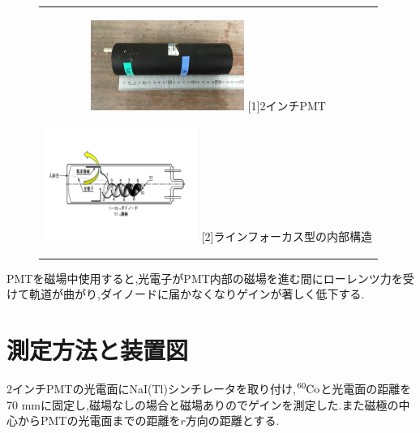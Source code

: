 \begin{figure}[htbp]
  \begin{center}
    \begin{tabular}{c}
      \begin{minipage}{0.5\hsize}    
        \begin{center}
          \includegraphics[clip,width=5cm]{fig/iguchi/PMTphoto.jpg}
	\hspace{1.6cm}[1]2インチPMT
     \end{center}
    \end{minipage}
      \begin{minipage}{0.5\hsize}    
        \begin{center}
          \includegraphics[clip,width=5cm]{fig/iguchi/PMTinner.pdf}
         \hspace{1.6cm}[2]ラインフォーカス型の内部構造
         \end{center}
        \end{minipage}
     
     \end{tabular}
     \label{PMT12}
    \end{center}
   \end{figure}

PMTを磁場中使用すると,光電子がPMT内部の磁場を進む間にローレンツ力を受けて軌道が曲がり,ダイノードに届かなくなりゲインが著しく低下する.


\section{測定方法と装置図}
2インチPMTの光電面にNaI(Tl)シンチレータを取り付け,$\ce{^{60}Co}$と光電面の距離を70 mmに固定し,磁場なしの場合と磁場ありのでゲインを測定した.また磁極の中心からPMTの光電面までの距離を$r$方向の距離とする.

